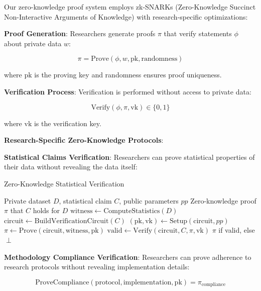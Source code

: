 \documentclass[10pt,twocolumn]{article}
\begin{document}
Our zero-knowledge proof system employs zk-SNARKs (Zero-Knowledge Succinct Non-Interactive Arguments of Knowledge) \cite{ben2014succinct} with research-specific optimizations:

\textbf{Proof Generation}: Researchers generate proofs $\pi$ that verify statements $\phi$ about private data $w$:

\begin{equation}
\pi = \text{Prove}(\phi, w, \text{pk}, \text{randomness})
\end{equation}

where $\text{pk}$ is the proving key and randomness ensures proof uniqueness.

\textbf{Verification Process}: Verification is performed without access to private data:

\begin{equation}
\text{Verify}(\phi, \pi, \text{vk}) \in \{0, 1\}
\end{equation}

where $\text{vk}$ is the verification key.

\textbf{Research-Specific Zero-Knowledge Protocols}:

\textbf{Statistical Claims Verification}: Researchers can prove statistical properties of their data without revealing the data itself:

\begin{algorithm}[H]
\caption{Zero-Knowledge Statistical Verification}
\label{alg:zk_stats}
\begin{algorithmic}[1]
\REQUIRE Private dataset $D$, statistical claim $C$, public parameters $pp$
\ENSURE Zero-knowledge proof $\pi$ that $C$ holds for $D$
\STATE $\text{witness} \leftarrow \text{ComputeStatistics}(D)$
\STATE $\text{circuit} \leftarrow \text{BuildVerificationCircuit}(C)$
\STATE $(\text{pk}, \text{vk}) \leftarrow \text{Setup}(\text{circuit}, pp)$
\STATE $\pi \leftarrow \text{Prove}(\text{circuit}, \text{witness}, \text{pk})$
\STATE $\text{valid} \leftarrow \text{Verify}(\text{circuit}, C, \pi, \text{vk})$
\RETURN $\pi$ if valid, else $\perp$
\end{algorithmic}
\end{algorithm}

\textbf{Methodology Compliance Verification}: Researchers can prove adherence to research protocols without revealing implementation details:

\begin{equation}
\text{ProveCompliance}(\text{protocol}, \text{implementation}, \text{pk}) = \pi_{\text{compliance}}
\end{equation}
\end{document}
